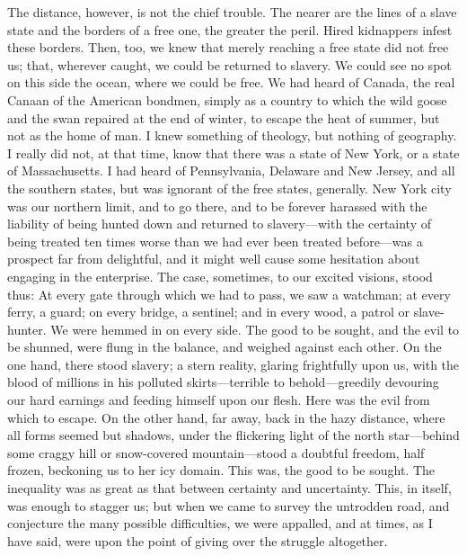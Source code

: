 The distance, however, is not the chief trouble. The nearer are the
lines of a slave state and the borders of a free one, the greater the
peril. Hired kidnappers infest these borders. Then, too, we knew that
merely reaching a free state did not free us; that, wherever caught, we
could be returned to slavery. We could see no spot on this side the
ocean, where we could be free. We had heard of Canada, the real Canaan
of the American bondmen, simply as a country to which the wild goose and
the swan repaired at {}the end of winter, to escape the heat of summer,
but not as the home of man. I knew something of theology, but nothing of
geography. I really did not, at that time, know that there was a state
of New York, or a state of Massachusetts. I had heard of Pennsylvania,
Delaware and New Jersey, and all the southern states, but was ignorant
of the free states, generally. New York city was our northern limit, and
to go there, and to be forever harassed with the liability of being
hunted down and returned to slavery---with the certainty of being
treated ten times worse than we had ever been treated before---was a
prospect far from delightful, and it might well cause some hesitation
about engaging in the enterprise. The case, sometimes, to our excited
visions, stood thus: At every gate through which we had to pass, we saw
a watchman; at every ferry, a guard; on every bridge, a sentinel; and in
every wood, a patrol or slave-hunter. We were hemmed in on every side.
The good to be sought, and the evil to be shunned, were flung in the
balance, and weighed against each other. On the one hand, there stood
slavery; a stern reality, glaring frightfully upon us, with the blood of
millions in his polluted skirts---terrible to behold---greedily
devouring our hard earnings and feeding himself upon our flesh. Here was
the evil from which to escape. On the other hand, far away, back in the
hazy distance, where all forms seemed but shadows, under the flickering
light of the north star---behind some craggy hill or snow-covered
mountain---stood a doubtful freedom, half frozen, beckoning us to her
icy domain. This was, the good to be sought. The inequality was as
{}great as that between certainty and uncertainty. This, in itself, was
enough to stagger us; but when we came to survey the untrodden road, and
conjecture the many possible difficulties, we were appalled, and at
times, as I have said, were upon the point of giving over the struggle
altogether.

